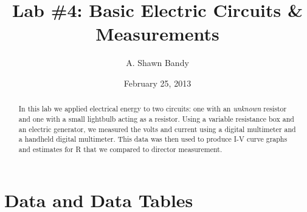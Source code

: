 \documentclass{article}
\begin{document}
\title{Lab \#4:  Basic Electric Circuits \& Measurements}
\author{A. Shawn Bandy}
\date{February 25, 2013}
\maketitle
\begin{abstract}
In this lab we applied electrical energy to two circuits:  one with an {\it{unknown}} resistor and one with a small lightbulb acting as a resistor.  Using a variable resistance box and an electric generator, we measured the volts and current using a digital multimeter and a handheld digital multimeter.  This data was then used to produce I-V curve graphs and estimates for R that we compared to director measurement.
\end{abstract}
\section{Data and Data Tables}
\end{document}
